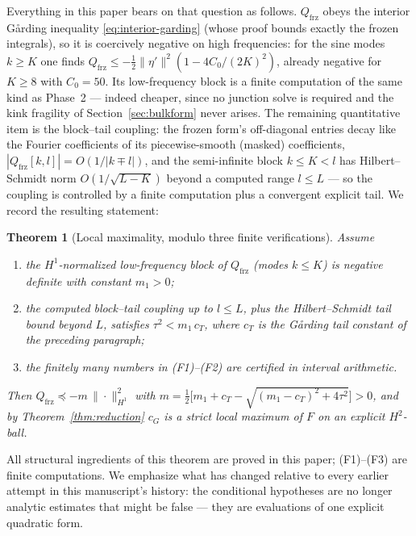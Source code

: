 \documentclass[11pt]{amsart}
\theoremstyle{plain}
\newtheorem{theorem}{Theorem}
\theoremstyle{definition}
\newcommand{\cG}{c_{G}}
\begin{document}
Everything in this paper bears on that question as follows.
$Q_{\mathrm{frz}}$ obeys the interior G\aa rding inequality
\eqref{eq:interior-garding} (whose proof bounds exactly the frozen
integrals), so it is coercively negative on high frequencies: for the
sine modes $k\geq K$ one finds $Q_{\mathrm{frz}}\leq
-\tfrac12\|\eta'\|^{2}(1-4C_{0}/(2K)^{2})$, already negative for
$K\geq8$ with $C_{0}=50$.  Its low-frequency block is a finite
computation of the same kind as Phase~2 --- indeed cheaper, since no
junction solve is required and the kink fragility of
Section~\ref{sec:bulkform} never arises.  The remaining quantitative
item is the block--tail coupling: the frozen form's off-diagonal
entries decay like the Fourier coefficients of its piecewise-smooth
(masked) coefficients, $|Q_{\mathrm{frz}}[k,l]| = O(1/|k\mp l|)$, and
the semi-infinite block $k\leq K<l$ has Hilbert--Schmidt norm
$O(1/\sqrt{L-K})$ beyond a computed range $l\leq L$ --- so the
coupling is controlled by a finite computation plus a convergent
explicit tail.  We record the resulting statement:

\begin{theorem}[Local maximality, modulo three finite verifications]
\label{thm:conditional-final}
Assume
\begin{enumerate}
\item[(F1)] the $H^{1}$-normalized low-frequency block of
$Q_{\mathrm{frz}}$ (modes $k\leq K$) is negative definite with
constant $m_{1}>0$;
\item[(F2)] the computed block--tail coupling up to $l\leq L$, plus
the Hilbert--Schmidt tail bound beyond $L$, satisfies
$\tau^{2} < m_{1}\,c_{T}$, where $c_{T}$ is the G\aa rding tail
constant of the preceding paragraph;
\item[(F3)] the finitely many numbers in (F1)--(F2) are certified in
interval arithmetic.
\end{enumerate}
Then $Q_{\mathrm{frz}}\preceq -m\,\|\cdot\|^{2}_{H^{1}}$ with
$m = \tfrac12\bigl[m_{1}+c_{T}-\sqrt{(m_{1}-c_{T})^{2}+4\tau^{2}}
\bigr]>0$, and by Theorem~\ref{thm:reduction} $\cG$ is a strict local
maximum of $F$ on an explicit $H^{2}$-ball.
\end{theorem}

All structural ingredients of this theorem are proved in this paper;
(F1)--(F3) are finite computations.  We emphasize what has changed
relative to every earlier attempt in this manuscript's history: the
conditional hypotheses are no longer analytic estimates that might be
false --- they are evaluations of one explicit quadratic form.
\end{document}
